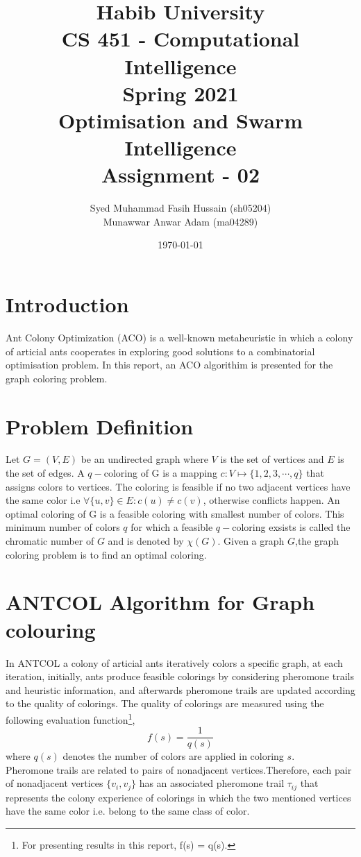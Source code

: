 \documentclass[a4paper]{article}
\title{Habib University \\ CS 451  - Computational Intelligence\\ Spring 2021 \\ Optimisation  and Swarm Intelligence\\Assignment  - 02}
\author{Syed Muhammad Fasih Hussain (sh05204) \\Munawwar Anwar Adam (ma04289)}
\date{\today}
\begin{document}
\setlength{\parskip}{10pt}
\setlength{\parindent}{0pt}
\maketitle

\section*{Introduction}
Ant Colony Optimization (ACO) is a well-known metaheuristic in which a colony of articial ants cooperates in exploring good solutions to a combinatorial
optimisation problem. In this report, an ACO algorithim is presented for the graph coloring problem.
\section*{Problem Definition}
Let $G = (V,E)$ be an undirected graph where $V$ is the set of vertices and $E$ is the set of edges.
A $q-$coloring of G is a mapping $c\colon V \mapsto \{1,2,3,\cdots,q\}$ that assigns colors to vertices. 
The coloring is feasible if no two adjacent vertices have the same color i.e $\forall \{u,v\} \in E\colon c(u) \neq c(v)$, otherwise conflicts happen. An optimal coloring of G
is a feasible coloring with smallest number of colors. This minimum number of colors $q$ for which a feasible $q-$coloring exsists is called the chromatic number of $G$
and is denoted by $\chi(G)$. Given a graph $G$,the graph coloring problem is to find an optimal coloring. 

\section*{ANTCOL Algorithm for Graph colouring}
In ANTCOL a colony of articial ants iteratively colors a specific graph, at each iteration, initially, ants produce feasible
colorings by considering pheromone  trails and heuristic information, and afterwards pheromone trails are updated according to the quality of colorings. The
quality of colorings are measured using the following evaluation function\footnote{For presenting results in this report, f(s) = q(s).},
\begin{equation}
    f(s) = \frac{1}{q(s)}
\end{equation}
where $q(s)$ denotes the number of colors are applied in coloring $s$.\\

Pheromone trails are related to pairs of nonadjacent vertices.Therefore, each pair of nonadjacent vertices $\{v_i,v_j\}$ has an associated pheromone trail
$\tau _{ij}$ that represents the colony experience of colorings in which the two mentioned vertices have the same color i.e. belong to the same class of color. \\
\end{document}

